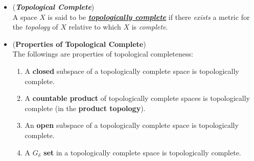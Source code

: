 \documentclass[11pt]{article}
\begin{document}
\begin{itemize}
\item \begin{definition} (\emph{\textbf{Topological Complete}})\\
A space $X$ is said to be \underline{\emph{\textbf{topologically complete}}} if there \emph{exists} a metric for the \emph{topology} of $X$ relative to which $X$ is \emph{complete}.
\end{definition}

\item \begin{proposition} (\textbf{Properties of Topological Complete}) \citep{munkres2000topology}\\
The followings are properties of topological completeness:
\begin{enumerate}
\item A \textbf{closed} subspace of a topologically complete space is topologically complete.
\item A \textbf{countable product} of topologically complete spaces is topologically complete (in the \textbf{product topology}).
\item An \textbf{open} subspace of a topologically complete space is topologically complete.
\item A \textbf{$G_{\delta}$ set} in a topologically complete space is topologically complete. 
\end{enumerate}
\end{proposition}
\end{itemize}
\end{document}
